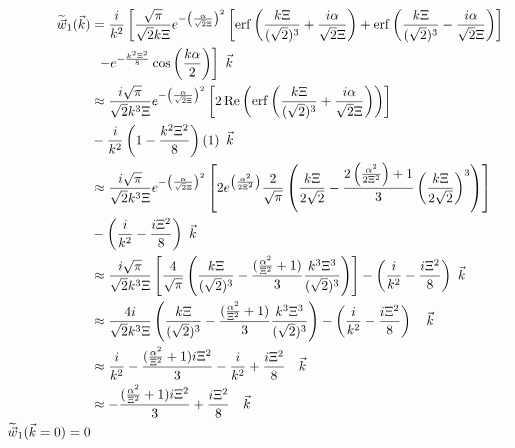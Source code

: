 \documentclass[double,12pt]{beavtex}
\begin{document}
\begin{align}
   \widetilde{\vec{w}}_1(\vec{k}) &= \frac{i}{k^2}\left[\frac{\sqrt{\pi}}
   {\sqrt{2}k\Xi}
   e^{-\left(\frac{\alpha}{\sqrt{2}\Xi}\right)^2}\left[\operatorname{erf}
   \left(\frac{k\Xi}{(\sqrt{2})^3}+\frac{i\alpha}{\sqrt{2}\Xi}\right)
   +\operatorname{erf}\left(\frac{k\Xi}{(\sqrt{2})^3}-\frac{i\alpha}
   {\sqrt{2}\Xi}
   \right)\right]\color{white}\right]\color{black}  \nonumber \\
 & \color{white}\left[\color{black}-e^{-\frac{k^2\Xi^2}{8}}\cos\left(
    \frac{k\alpha}{2}\right)\right]{~}\color{black}\vec{k} \\
    & \approx  \frac{i\sqrt{\pi}}{\sqrt{2}k^3\Xi}e^{-\left(\frac{\alpha}
    {\sqrt{2}\Xi}\right)^2}\left[2\operatorname{Re}\left(\operatorname{erf}
    \left(\frac{k\Xi}{(\sqrt{2})^3}+\frac{i\alpha}{\sqrt{2}\Xi}\right)
    \right)\right] \nonumber \\
    &-\frac{i}{k^2}\left(1-\frac{k^2\Xi^2}{8}\right)\left(1\right) 
    {~}\vec{k} \\
    & \approx  \frac{i\sqrt{\pi}}{\sqrt{2}k^3\Xi}e^{-\left(\frac{\alpha}
    {\sqrt{2}\Xi}\right)^2}\left[2e^{\left(\frac{\alpha^2}{2\Xi^2}\right)}
    \frac{2}{\sqrt{\pi}}   \left(\frac{k\Xi}{2\sqrt{2}}   -\frac{2\left(
    \frac{\alpha^2}{2\Xi^2}\right)+1}{3}\left(\frac{k\Xi}{2\sqrt{2}}
    \right)^3\right)\right] \nonumber \\
    &-\left(\frac{i}{k^2}-\frac{i\Xi^2}{8}\right) {~}\vec{k}\\
    & \approx  \frac{i\sqrt{\pi}}{\sqrt{2}k^3\Xi}\left[\frac{4}{\sqrt{\pi}}
    \left(\frac{k\Xi}{(\sqrt{2})^3} -\frac{(\frac{\alpha^2}{\Xi^2}+1)}{3}
    \frac{k^3\Xi^3}{(\sqrt{2})^3}\right)\right] -\left(\frac{i}{k^2}
    -\frac{i\Xi^2}{8}\right) {~}\vec{k}\\
    & \approx  \frac{4i}{\sqrt{2}k^3\Xi}\left(\frac{k\Xi}{(\sqrt{2})^3} 
    -\frac{(\frac{\alpha^2}{\Xi^2}+1)}{3}\frac{k^3\Xi^3}{(\sqrt{2})^3}
    \right)-\left(\frac{i}{k^2}-\frac{i\Xi^2}{8}\right) {~~~}\vec{k}\\
    & \approx  \frac{i}{k^2} -\frac{(\frac{\alpha^2}{\Xi^2}+1)i\Xi^2}{3}
    -\frac{i}{k^2}+\frac{i\Xi^2}{8} {~~~}\vec{k}\\
    & \approx  -\frac{(\frac{\alpha^2}{\Xi^2}+1)i\Xi^2}{3}
    +\frac{i\Xi^2}{8} {~~~}\vec{k}\\
     \widetilde{\vec w}_1(\vec k=0) = 0 
\end{align}
\end{document}
